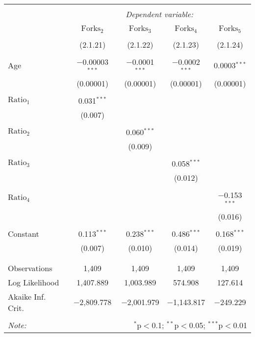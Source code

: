
\begin{tabular}{@{\extracolsep{5pt}}lcccc}
\\[-1.8ex]\hline
\hline \\[-1.8ex]
 & \multicolumn{4}{c}{\textit{Dependent variable:}} \\
\cline{2-5}
\\[-1.8ex] & $\text{Forks}_{2}$ & $\text{Forks}_{3}$ & $\text{Forks}_{4}$ & $\text{Forks}_{5}$ \\
\\[-1.8ex] & (2.1.21) & (2.1.22) & (2.1.23) & (2.1.24)\\ 
\hline \\[-1.8ex]
 Age & $-$0.00003$^{***}$ & $-$0.0001$^{***}$ & $-$0.0002$^{***}$ & 0.0003$^{***}$ \\
  & (0.00001) & (0.00001) & (0.00001) & (0.00001) \\
  & & & & \\
 $\text{Ratio}_{1}$ & 0.031$^{***}$ &  &  &  \\
  & (0.007) &  &  &  \\
  & & & & \\
 $\text{Ratio}_{2}$ &  & 0.060$^{***}$ &  &  \\
  &  & (0.009) &  &  \\
  & & & & \\
 $\text{Ratio}_{3}$ &  &  & 0.058$^{***}$ &  \\
  &  &  & (0.012) &  \\
  & & & & \\
 $\text{Ratio}_{4}$ &  &  &  & $-$0.153$^{***}$ \\
  &  &  &  & (0.016) \\
  & & & & \\
 Constant & 0.113$^{***}$ & 0.238$^{***}$ & 0.486$^{***}$ & 0.168$^{***}$ \\
  & (0.007) & (0.010) & (0.014) & (0.019) \\
  & & & & \\
\hline \\[-1.8ex]
Observations & 1,409 & 1,409 & 1,409 & 1,409 \\
Log Likelihood & 1,407.889 & 1,003.989 & 574.908 & 127.614 \\
Akaike Inf. Crit. & $-$2,809.778 & $-$2,001.979 & $-$1,143.817 & $-$249.229 \\
\hline
\hline \\[-1.8ex]
\textit{Note:}  & \multicolumn{4}{r}{$^{*}$p$<$0.1; $^{**}$p$<$0.05; $^{***}$p$<$0.01} \\
\end{tabular}
